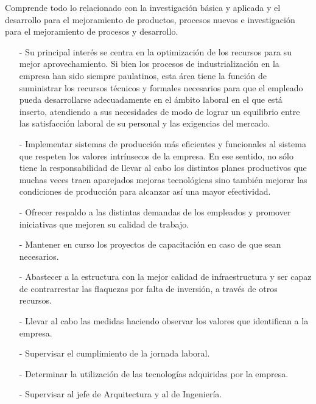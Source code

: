 \documentclass[a4paper,10pt,titlepage]{article}
\begin{document}
{
Comprende todo lo relacionado con la investigaci\'on b\'asica y aplicada y el desarrollo para el mejoramiento de productos, 
procesos nuevos e investigaci\'on para el mejoramiento de procesos y desarrollo.
}
{
\begin{itemize}
	\item[-] Su principal inter\'es se centra en la optimizaci\'on de los recursos para su mejor aprovechamiento.
		Si bien los procesos de industrializaci\'on en la empresa han sido siempre paulatinos, 
		esta \'area tiene la funci\'on de suministrar los recursos t\'ecnicos y formales necesarios para que el empleado
		pueda desarrollarse adecuadamente en el \'ambito laboral en el que est\'a inserto, atendiendo a sus necesidades 
		de modo de lograr un equilibrio entre las satisfacci\'on laboral de su personal y las exigencias del mercado.
	
\end{itemize}
}
{
\begin{itemize}
   \item[-] Implementar sistemas de producci\'on m\'as eficientes y funcionales al sistema que respeten los valores intr\'insecos de la empresa. 
	    En ese sentido, no s\'olo tiene la responsabilidad de llevar al cabo los distintos planes productivos que muchas veces traen aparejados 
	    mejoras tecnol\'ogicas sino tambi\'en mejorar las condiciones de producci\'on para alcanzar as\'i una mayor efectividad. 
   \item[-] Ofrecer respaldo a las distintas demandas de los empleados y promover iniciativas que mejoren su calidad de trabajo. 
   \item[-] Mantener en curso los proyectos de capacitaci\'on en caso de que sean necesarios. 
   \item[-] Abastecer a la estructura con la mejor calidad de infraestructura y ser capaz de contrarrestar  las flaquezas por falta de inversi\'on, a trav\'es de otros recursos. 
   \item[-] Llevar al cabo las medidas haciendo observar los valores que identifican a la empresa. 

\end{itemize}	
}
{
\begin{itemize}

   \item[-] Supervisar el cumplimiento de la jornada laboral. 
   \item[-] Determinar la utilizaci\'on de las tecnolog\'ias adquiridas por la empresa. 
   \item[-] Supervisar al jefe de Arquitectura y al de Ingeniería.

\end{itemize}
}
\end{document}
